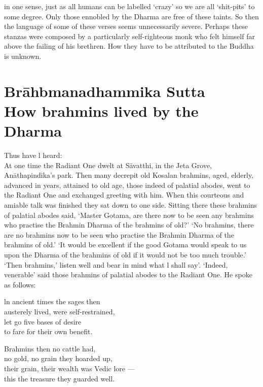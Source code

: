 in one sense, just as all humans can be labelled `crazy' so we are all `shit-pits' to some degree. Only those ennobled by the Dharma are free of these taints. So then the language of some of these verses seems unnecessarily severe. Perhaps these stanzas were composed by a particularly self-righteous monk who felt himself far above the failing of his brethren. How they have to be attributed to the Buddha is unknown.
  
  
\chapter{Br\=ahbmanadhammika Sutta\\ How brahmins lived by the Dharma}

Thus have l heard:\\
\newline
At one time the Radiant One dwelt at S\=avatthi, in the Jeta Grove, An\=athapindika's park. Then many decrepit old Kosalan brahmins, aged, elderly, advanced in years, attained to old age, those indeed of palatial abodes, went to the Radiant One and exchanged greeting with him. When this courteous and amiable talk was finished they sat down to one side. Sitting there these brahmins of palatial abodes said, `Master Gotama, are there now to be seen any brahmins who practise the Brahmin Dharma of the brahmins of old?' `No brahmins, there are no brahmins now to be seen who practise the Brahmin Dharma of the brahmins of old.' `It would be excellent if the good Gotama would speak to us upon the Dharma of the brahmins of old if it would not be too much trouble.' `Then brahmins,' listen well and bear in mind what l shall say'. `Indeed, venerable' said those brahmins of palatial abodes to the Radiant One. He spoke as follows:\\

\begin{MyDescription}{}
ln ancient times the sages then\\
austerely lived, were self-restrained,\\
let go five bases of desire\\
to fare for their own benefit.
\end{MyDescription}  

\begin{MyDescription}{}
Brahmins then no cattle had,\\
no gold, no grain they hoarded up,\\
their grain, their wealth was Vedic lore —\\
this the treasure they guarded well.
\end{MyDescription}  

